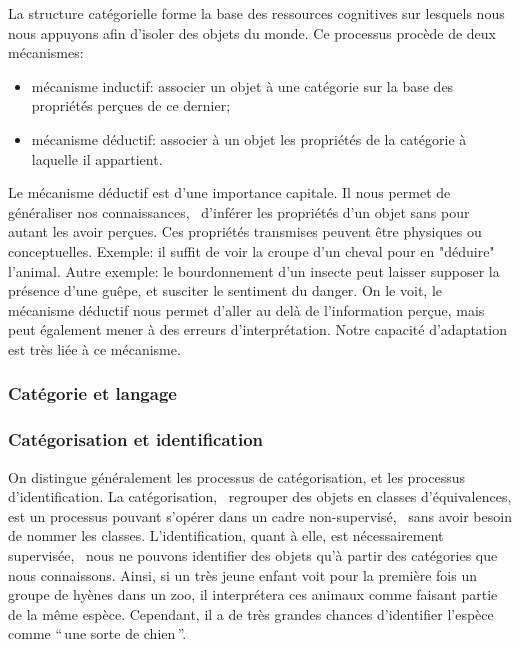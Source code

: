 La structure catégorielle forme la base des ressources cognitives sur lesquels nous nous appuyons afin d'isoler des objets du monde. Ce processus procède de deux mécanismes:

\begin{itemize} 
\item mécanisme inductif: associer un objet à une catégorie sur la base des propriétés perçues de ce dernier;
\item mécanisme déductif: associer à un objet les propriétés de la catégorie à laquelle il appartient.
\end{itemize}

Le mécanisme déductif est d'une importance capitale. Il nous permet de généraliser nos connaissances, \ie~d'inférer les propriétés d'un objet sans pour autant les avoir perçues. Ces propriétés transmises peuvent être physiques ou conceptuelles. Exemple: il suffit de voir la croupe d'un cheval pour en "déduire" l'animal. Autre exemple: le bourdonnement d'un insecte peut laisser supposer la présence d'une guêpe, et susciter le sentiment du danger. On le voit, le mécanisme déductif nous permet d'aller au delà de l'information perçue, mais peut également mener à des erreurs d'interprétation. Notre capacité d’adaptation est très liée à ce mécanisme.

\subsubsection{Catégorie et langage}
\label{sec:ch3_catLang}


\subsubsection{Catégorisation et identification}

On distingue généralement les processus de catégorisation, et les processus d'identification.  La catégorisation, \ie~regrouper des objets en classes d'équivalences, est un processus pouvant s'opérer dans un cadre non-supervisé, \ie~sans avoir besoin de nommer les classes. L'identification, quant à elle, est nécessairement supervisée, \ie~nous ne pouvons identifier des objets qu'à partir des catégories que nous connaissons. Ainsi, si un très jeune enfant voit pour la première fois un groupe de hyènes dans un zoo, il interprétera ces animaux comme faisant partie de la même espèce. Cependant, il a de très grandes chances d’identifier l'espèce comme ``\,une sorte de chien\,''.


